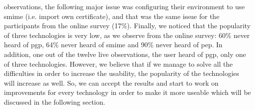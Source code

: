 observations, the following major issue was configuring their environment to use \acrshort{smime} (i.e. import own certificate), and that was the same issue for the participants from the online survey (17\%). Finally, we noticed that the popularity of three technologies is very low, as we observe from the online survey: 60\% never heard of \acrshort{pgp}, 64\% never heard of \acrshort{smime} and 90\% never
heard of \acrshort{pep}. In addition, one out of the twelve live observations, the user heard of \acrshort{pgp}, only one of three technologies. However, we believe that if we manage to solve all the difficulties in order to increase the usability, the popularity of the technologies will increase as well. So, we can accept the results and start to work on improvements for every technology in order to make
it more useable which will be discussed in the following section.